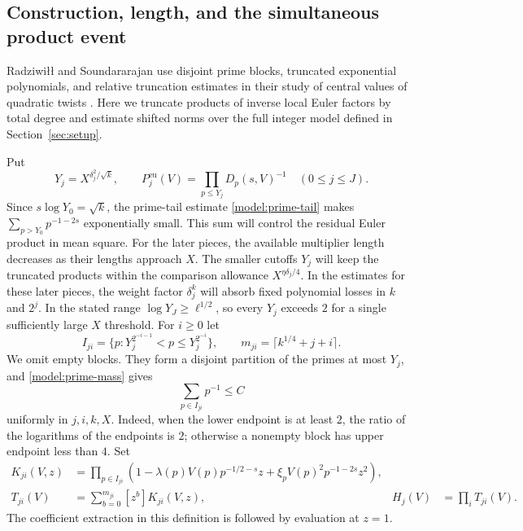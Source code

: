 \subsection{Construction, length, and the simultaneous product event}

Radziwi\l\l{} and Soundararajan use disjoint prime blocks, truncated
exponential polynomials, and relative truncation estimates in their
study of central values of quadratic twists
\cite[Sections~3, 8, and~9]{RadziwillSoundararajan2015}.
Here we truncate products of inverse local Euler factors by total
degree and estimate shifted norms over the full integer model defined
in Section~\ref{sec:setup}.

Put
\[
 Y_j=X^{\delta_j^2/\sqrt k},\qquad
 P_j^{\mathrm{eu}}(V)=\prod_{p\le Y_j}D_p(s,V)^{-1}
 \quad(0\le j\le J).
\]
Since $s\log Y_0=\sqrt k$, the prime-tail estimate
\eqref{model:prime-tail} makes $\sum_{p>Y_0}p^{-1-2s}$ exponentially
small. This sum will control the residual Euler product in mean square.
For the later pieces, the available
multiplier length decreases as their lengths approach $X$.
The smaller cutoffs $Y_j$ will keep the truncated products within
the comparison allowance $X^{\eta\delta_j/4}$.
In the estimates for these later pieces, the weight factor $\delta_j^k$
will absorb fixed polynomial losses in $k$ and $2^j$.
In the stated range $\log Y_J\ge\ell^{1/2}$, so every $Y_j$ exceeds
$2$ for a single sufficiently large $X$ threshold.  For $i\ge0$ let
\[
 I_{ji}=\{p:Y_j^{2^{-i-1}}<p\le Y_j^{2^{-i}}\},\qquad
 m_{ji}=\lceil k^{1/4}+j+i\rceil.
\]
We omit empty blocks.  They form a disjoint partition of the primes at
most $Y_j$, and \eqref{model:prime-mass} gives
\begin{equation}
 \sum_{p\in I_{ji}}p^{-1}\le C
 \label{model:block-mass}
\end{equation}
uniformly in $j,i,k,X$.  Indeed, when the lower endpoint is at least
$2$, the ratio of the logarithms of the endpoints is $2$; otherwise a
nonempty block has upper endpoint less than $4$.
Set
\begin{align}
 K_{ji}(V,z)&=\prod_{p\in I_{ji}}
  \left(1-\lambda(p)V(p)p^{-1/2-s}z
          +\xi_pV(p)^2p^{-1-2s}z^2\right),
 \nonumber\\
 T_{ji}(V)&=\sum_{b=0}^{m_{ji}}[z^b]K_{ji}(V,z),
 &H_j(V)&=\prod_i T_{ji}(V).
 \label{model:mollifier-definition}
\end{align}
The coefficient extraction in this definition is followed by evaluation
at $z=1$.

